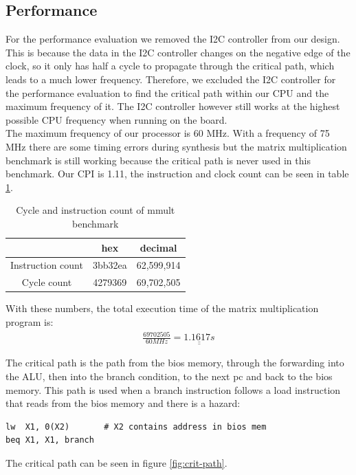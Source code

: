 \documentclass[12pt]{article}
\begin{document}
\subsection{Performance}
For the performance evaluation we removed the I2C controller from our design. This is because the data in the I2C controller changes on the negative edge of the clock, so it only has half a cycle to propagate through the critical path, which leads to a much lower frequency. Therefore, we excluded the I2C controller for the performance evaluation to find the critical path within our CPU and the maximum frequency of it. The I2C controller however still works at the highest possible CPU frequency when running on the board.\\
The maximum frequency of our processor is 60 MHz. With a frequency of 75 MHz there are some timing errors during synthesis but the matrix multiplication benchmark is still working because the critical path is never used in this benchmark. Our CPI is 1.11, the instruction and clock count can be seen in table \ref{tab:performance}.

\begin{table}[!hbtp]
\centering
\begin{tabular}{|c|c|c|}
\hline
& hex & decimal \\
\hline
Instruction count & 3bb32ea & 62,599,914\\
Cycle count & 4279369 & 69,702,505\\
\hline
\end{tabular}
\caption{Cycle and instruction count of mmult benchmark}
\label{tab:performance}
\end{table}

With these numbers, the total execution time of the matrix multiplication program is:
\begin{gather*}
\frac{69702505}{60 MHz} = \underline{\underline{1.1617s}}
\end{gather*}


The critical path is the path from the bios memory, through the forwarding into the ALU, then into the branch condition, to the next pc and back to the bios memory. This path is used when a branch instruction follows a load instruction that reads from the bios memory and there is a hazard: 

\begin{lstlisting}
lw  X1, 0(X2)       # X2 contains address in bios mem
beq X1, X1, branch 
\end{lstlisting}

The critical path can be seen in figure \ref{fig:crit-path}.
\end{document}
